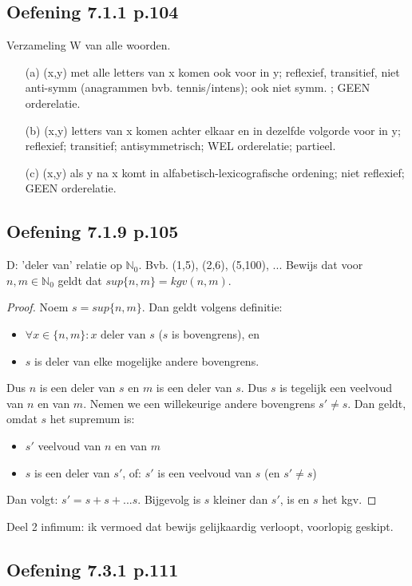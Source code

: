 \documentclass{article}
\begin{document}
\subsection*{Oefening 7.1.1 p.104}
Verzameling W van alle woorden. 
\begin{itemize}
    \item [(a)] (x,y) met alle letters van x komen ook voor in y; reflexief, transitief, niet anti-symm (anagrammen bvb. tennis/intens); ook niet symm. ; GEEN orderelatie. 
    \item [(b)] (x,y) letters van x komen achter elkaar en in dezelfde volgorde voor in y; reflexief; transitief; antisymmetrisch; WEL orderelatie; partieel. 
    \item [(c)] (x,y) als y na x komt in alfabetisch-lexicografische ordening; niet reflexief; GEEN orderelatie. 
\end{itemize}


\subsection*{Oefening 7.1.9 p.105}
D: 'deler van' relatie op $\mathbb{N}_0$. Bvb. (1,5), (2,6), (5,100), ... 
Bewijs dat voor $n,m \in \mathbb{N}_0$ geldt dat $sup \{n,m\} = kgv(n,m)$. 
\begin{proof}
Noem $s = sup \{n,m\}$. Dan geldt volgens definitie: 
\begin{itemize}
    \item $\forall x \in \{n,m\}: x \text{ deler van } s$ ($s$ is bovengrens), en 
    \item $s$ is deler van elke mogelijke andere bovengrens.
\end{itemize}
Dus $n$ is een deler van $s$ en $m$ is een deler van $s$. Dus $s$ is tegelijk een veelvoud van $n$ en van $m$. 
Nemen we een willekeurige andere bovengrens $s' \neq s$. Dan geldt, omdat $s$ het supremum is: 
\begin{itemize}
    \item $s'$ veelvoud van $n$ en van $m$
    \item $s$ is een deler van $s'$, of: $s'$ is een veelvoud van $s$ (en $s' \neq s$) 
\end{itemize}
Dan volgt: $s' = s + s + ... s$. Bijgevolg is $s$ kleiner dan $s'$, is en $s$ het kgv. 
\end{proof}

Deel 2 infimum: ik vermoed dat bewijs gelijkaardig verloopt, voorlopig geskipt. 

\subsection*{Oefening 7.3.1 p.111}
\end{document}
